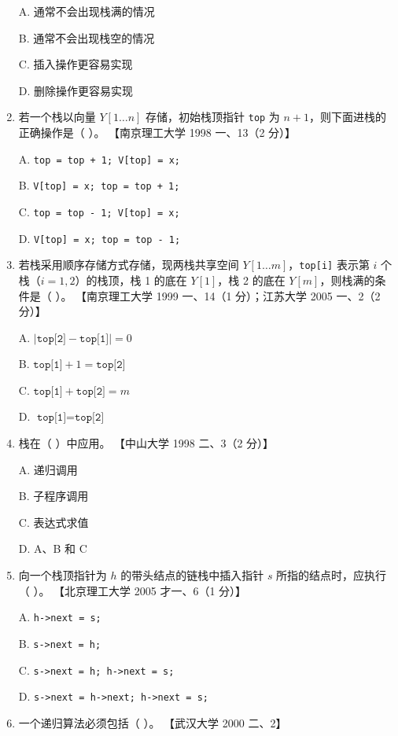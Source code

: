\documentclass[lang=cn,newtx,10pt,scheme=chinese]{elegantbook}
\begin{document}
\begin{enumerate}
    A. 通常不会出现栈满的情况  

    B. 通常不会出现栈空的情况 

    C. 插入操作更容易实现  

    D. 删除操作更容易实现  

    \item 若一个栈以向量 $Y[1 \ldots n]$ 存储，初始栈顶指针 \texttt{top} 为 $n+1$，则下面进栈的正确操作是（ ）。  
    【南京理工大学 1998 一、13（2 分）】  

    A. \texttt{top = top + 1; V[top] = x;}  

    B. \texttt{V[top] = x; top = top + 1;}  

    C. \texttt{top = top - 1; V[top] = x;}  

    D. \texttt{V[top] = x; top = top - 1;}  

    \item 若栈采用顺序存储方式存储，现两栈共享空间 $Y[1 \ldots m]$，\texttt{top[i]} 表示第 $i$ 个栈（$i=1, 2$）的栈顶，栈 1 的底在 $Y[1]$，栈 2 的底在 $Y[m]$，则栈满的条件是（ ）。  
    【南京理工大学 1999 一、14（1 分）；江苏大学 2005 一、2（2 分）】  

    A. $| \texttt{top[2]} - \texttt{top[1]} | = 0$  

    B. $\texttt{top[1]} + 1 = \texttt{top[2]}$  

    C. $\texttt{top[1]} + \texttt{top[2]} = m$  

    D. $\texttt{top[1]} = \texttt{top[2]}$  

    \item 栈在（ ）中应用。  
    【中山大学 1998 二、3（2 分）】  

    A. 递归调用  

    B. 子程序调用  

    C. 表达式求值  

    D. A、B 和 C  

    \item 向一个栈顶指针为 $h$ 的带头结点的链栈中插入指针 $s$ 所指的结点时，应执行（ ）。  
    【北京理工大学 2005 才一、6（1 分）】  

    A. \texttt{h->next = s;}  
    
    B. \texttt{s->next = h;}  

    C. \texttt{s->next = h; h->next = s;}  

    D. \texttt{s->next = h->next; h->next = s;}  

    \item 一个递归算法必须包括（ ）。  
    【武汉大学 2000 二、2】  


\end{enumerate}
\end{document}
